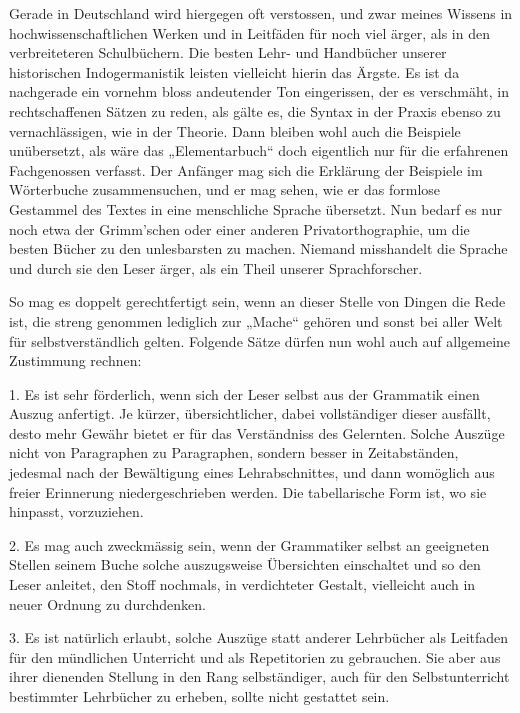 Gerade in Deutschland wird hiergegen oft verstossen, und zwar meines Wissens in hochwissenschaftlichen Werken und in Leitfäden für  noch viel ärger, als in den verbreiteteren Schulbüchern. Die besten Lehr- und Handbücher unserer historischen Indogermanistik leisten vielleicht hierin das Ärgste. Es ist da nachgerade ein vornehm bloss andeutender Ton eingerissen, der es verschmäht, in rechtschaffenen Sätzen zu reden, als gälte es, die Syntax in der Praxis ebenso zu vernachlässigen, wie in der Theorie. Dann bleiben wohl auch die Beispiele unübersetzt, als wäre das „Elementarbuch“ doch eigentlich nur für die erfahrenen Fachgenossen verfasst. Der Anfänger mag sich die Erklärung der Beispiele im Wörterbuche zusammensuchen, und er mag sehen, wie er das formlose Gestammel des Textes in eine menschliche Sprache übersetzt. Nun bedarf es nur noch etwa der Grimm’schen oder einer anderen Privatorthographie, um die besten Bücher zu den unlesbarsten zu machen. Niemand misshandelt die Sprache und durch sie den Leser ärger, als ein Theil unserer Sprachforscher.

So mag es doppelt gerechtfertigt sein, wenn an dieser Stelle von Dingen die Rede ist, die streng genommen lediglich zur „Mache“ gehören und sonst bei aller Welt für selbstverständlich gelten. Folgende Sätze dürfen nun wohl auch auf allgemeine Zustimmung rechnen:

1. Es ist sehr förderlich, wenn sich der Leser selbst aus der Grammatik einen Auszug anfertigt. Je kürzer, übersichtlicher, dabei vollständiger dieser ausfällt, desto mehr Gewähr bietet er für das Verständniss des Gelernten. Solche Auszüge  nicht von Paragraphen zu Paragraphen, sondern besser in Zeitabständen, jedesmal nach der Bewältigung eines Lehrabschnittes, und dann womöglich aus freier Erinnerung niedergeschrieben werden. Die tabellarische Form ist, wo sie hinpasst, vorzuziehen.

2. Es mag auch zweckmässig sein, wenn der Grammatiker selbst an geeigneten Stellen seinem Buche solche auszugsweise Übersichten \label{fp.114} einschaltet und so den Leser anleitet, den Stoff nochmals, in verdichteter Gestalt, vielleicht auch in neuer Ordnung zu durchdenken.

\label{sp.109}

3. Es ist natürlich erlaubt, solche Auszüge statt anderer Lehrbücher als Leitfaden für den mündlichen Unterricht und als Repetitorien zu gebrauchen. Sie aber aus ihrer dienenden Stellung in den Rang selbständiger, auch für den Selbstunterricht bestimmter Lehrbücher zu erheben, sollte nicht gestattet sein.

